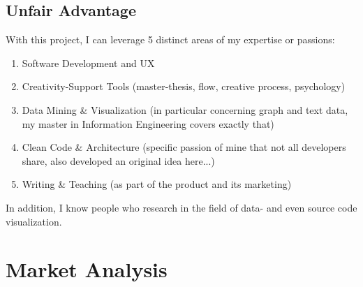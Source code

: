 \documentclass{article}
\begin{document}
\subsection{Unfair Advantage}

With this project, I can leverage 5 distinct areas of my expertise or passions:
\begin{enumerate}
	\item Software Development and UX
	\item Creativity-Support Tools (master-thesis, flow, creative process, psychology)
	\item Data Mining \& Visualization (in particular concerning graph and text data, my master in Information Engineering covers exactly that)
	\item Clean Code \& Architecture (specific passion of mine that not all developers share, also developed an original idea here...)
	\item Writing \& Teaching (as part of the product and its marketing)
\end{enumerate}

In addition, I know people who research in the field of data- and even source code visualization.

\section{Market Analysis}
\end{document}
